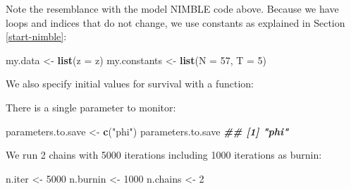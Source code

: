 \documentclass[
  12pt,
]{krantz}
\newenvironment{Shaded}{\begin{snugshade}}{\end{snugshade}}
\newcommand{\AttributeTok}[1]{\textcolor[rgb]{0.13,0.29,0.53}{#1}}
\newcommand{\ControlFlowTok}[1]{\textcolor[rgb]{0.13,0.29,0.53}{\textbf{#1}}}
\newcommand{\DecValTok}[1]{\textcolor[rgb]{0.00,0.00,0.81}{#1}}
\newcommand{\DocumentationTok}[1]{\textcolor[rgb]{0.56,0.35,0.01}{\textbf{\textit{#1}}}}
\newcommand{\FunctionTok}[1]{\textcolor[rgb]{0.13,0.29,0.53}{\textbf{#1}}}
\newcommand{\NormalTok}[1]{#1}
\newcommand{\OtherTok}[1]{\textcolor[rgb]{0.56,0.35,0.01}{#1}}
\newcommand{\StringTok}[1]{\textcolor[rgb]{0.31,0.60,0.02}{#1}}
\begin{document}
Note the resemblance with the model NIMBLE code above. Because we have loops and indices that do not change, we use constants as explained in Section \ref{start-nimble}:

\begin{Shaded}
\begin{Highlighting}[]
\NormalTok{my.data }\OtherTok{\textless{}{-}} \FunctionTok{list}\NormalTok{(}\AttributeTok{z =}\NormalTok{ z)}
\NormalTok{my.constants }\OtherTok{\textless{}{-}} \FunctionTok{list}\NormalTok{(}\AttributeTok{N =} \DecValTok{57}\NormalTok{, }\AttributeTok{T =} \DecValTok{5}\NormalTok{)}
\end{Highlighting}
\end{Shaded}

We also specify initial values for survival with a function:

\begin{Shaded}
\end{Shaded}

There is a single parameter to monitor:

\begin{Shaded}
\begin{Highlighting}[]
\NormalTok{parameters.to.save }\OtherTok{\textless{}{-}} \FunctionTok{c}\NormalTok{(}\StringTok{"phi"}\NormalTok{)}
\NormalTok{parameters.to.save}
\DocumentationTok{\#\# [1] "phi"}
\end{Highlighting}
\end{Shaded}

We run 2 chains with 5000 iterations including 1000 iterations as burnin:

\begin{Shaded}
\begin{Highlighting}[]
\NormalTok{n.iter }\OtherTok{\textless{}{-}} \DecValTok{5000}
\NormalTok{n.burnin }\OtherTok{\textless{}{-}} \DecValTok{1000}
\NormalTok{n.chains }\OtherTok{\textless{}{-}} \DecValTok{2}
\end{Highlighting}
\end{Shaded}
\end{document}
